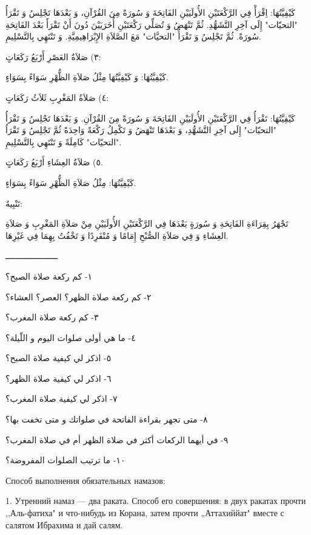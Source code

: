 \documentclass[a5paper]{article}
\begin{document}
كَيْفِيَّتُهَا: اِقْرَأْ فِي الرَّكْعَتَيْنِ الأُولَيَيْنِ الفَاتِحَةَ وَ سُورَةً مِنَ القُرْآنِ، وَ بَعْدَهَا تَجْلِسُ وَ تَقْرَأُ "التحيّات" إِلَى آخِرِ التَّشَهُّدِ. ثُمَّ تَنْهَضُ وَ تُصَلِّي رَكْعَتَيْنِ أُخَرَيَيْنَ دُونَ أَنْ تَقْرَأََ بَعْدَ الفَاتِحَةِ سُورَةً. ثُمَّ تَجْلِسُ وَ تَقْرَأُ "التحيَّات" مَعَ الصَّلاَةِ الإِبْرَاهِيمِيَّةِ. وَ تَنْتَهِي بِالتَّسْلِيمِ.

٣) صَلاَةُ العَصْرِ أَرْبَعُ رَكَعَاتٍ:

كَيْفِيَّتُهَا: وَ كَيْفِيَّتُهَا مِثْلُ صَلاَةِ الظُّهْرِ سَوَاءً بِسَوَاءٍ.

٤) صَلاَةُ المَغْرِبِ ثَلاَثُ رَكَعَاتٍ:

كَيْفِيَّتُهَا: تَقْرَأُ فِي الرَّكْعَتَيْنِ الأُولَيَيْنِ الفَاتِحَةَ وَ سُورَةً مِنَ القُرْآنِ. وَ بَعْدَهَا تَجْلِسُ وَ تَقْرَأُ "التحيّات" إِلَى آخِرِ التَّشَهُّدِ، وَ بَعْدَهَا تَنْهَضُ وَ تَكْمِلُ رَكْعَةً وَاحِدَةً ثُمَّ تَجْلِسُ وَ تَقْرَاُ "التحيّات" كَامِلَةً وَ تَنْتَهِي بِالتَّسْلِيمِ.

٥) صَلاَةُ العِشَاءِ أَرْبَعُ رَكَعَاتٍ.

كَيْفِيَّتُهَا: مِثْلُ صَلاَةِ الظُّهْرِ سَوَاءً بِسَوَاءٍ.

تَنْبِيهٌ:

تَجْهَرُ بِقِرَاءَةِ الفَاتِحَةِ وَ سُورَةٍ بَعْدَهَا فِي الرَّكْعَتَيْنِ الأُولَيَيْنِ مِنْ صَلاَةِ المَغْرِبِ وَ صَلاَةِ العِشَاءِ وَ فِي صَلاَةِ الصُّبْحِ إِمَامًا وَ مُنْفَرِدًا وَ تَخْفُتُ بِهِمَا فِي غَيْرِهَا.

ـــــــــــــــــــــ

١- كم ركعة صلاة الصبح؟

٢- كم ركعة صلاة الظهر؟ العصر؟ العشاء؟

٣- كم ركعة صلاة المغرب؟

٤- ما هي أولى صلوات اليوم و اللّيلة؟

٥- اذكر لي كيفية صلاة الصبح؟

٦- اذكر لي كيفية صلاة الظهر؟

٧- اذكر لي كيفية صلاة المغرب؟

٨- متى تجهر بقراءة الفاتحة في صلواتك و متى تخفت بها؟

٩- في أيهما الركعات أكثر في صلاة الظهر أم في صلاة المغرب؟

١٠- ما ترتيب الصلوات المفروضة؟

Способ выполнения обязательных намазов:

1. Утренний намаз — два раката. Способ его совершения: в двух ракатах прочти ,,Аль-фатиха" и что-нибудь из Корана, затем прочти „Аттахиййат" вместе с салятом Ибрахима и дай салям.
\end{document}
